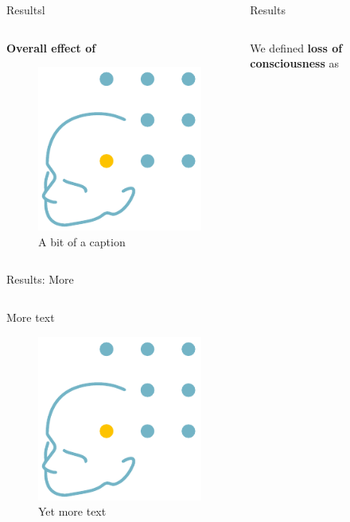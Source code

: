 \documentclass{beamer}
\renewcommand{\emph}{\textbf}
\newenvironment{wideitemize}{\itemize\addtolength{\itemsep}{.2em}\addtolength{\labelsep}{.1ex}}{\enditemize}
\begin{document}
\begin{frame}[t]
\begin{columns}[T]
\begin{column}{.32\linewidth}
\begin{block}{Resultsl}
\begin{columns}[T]
\begin{column}{.95\linewidth}
\emph{Overall effect of}
\begin{wideitemize}
\item 
\end{wideitemize}
\begin{figure}
\label{fig:proptimecourse}
\begin{center}
\includegraphics[width=.2\linewidth]{logo-epi.png}
\end{center}
\caption{A bit of a caption}
\end{figure}
\end{column}
\end{columns}
\end{block}
\begin{block}{Results: More}
\begin{columns}
\begin{column}{.95\linewidth}
More text

\begin{figure}
\label{fig:severalunits}
\begin{center}
\includegraphics[width=.2\linewidth]{logo-epi.png}
\end{center}
\caption{Yet more text}
\end{figure}
\end{column}
\end{columns}
\end{block}


\end{column}

\begin{column}{.32\linewidth}
\begin{block}{Results}
\begin{columns}[T]
\begin{column}{.95\linewidth}
\begin{wideitemize}
\item We defined \emph{loss of consciousness} as
\item 
\item 
\item 


\end{wideitemize}
\end{column}
\end{columns}
\end{block}
\end{column}
\end{columns}
\end{frame}
\end{document}
